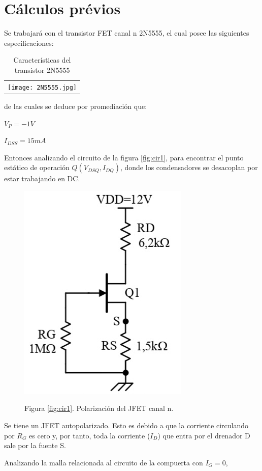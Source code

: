 \documentclass[12pt, a4paper]{article}
\begin{document}
    \newpage

    \section{Cálculos prévios}

    Se trabajará con el transistor FET canal n 2N5555, el cual posee las siguientes especificaciones:
    
    \begin{table}[h!]
        \centering
        \caption{Características del transistor 2N5555} %
        \label{tab:5555} %
        \begin{tabular}{c}
            \texttt{[image: 2N5555.jpg]} \\
        \end{tabular}
    \end{table}
    
    de las cuales se deduce por promediación que:

    $V_P = -1V$

    $I_{DSS} = 15mA$

    Entonces analizando el circuito de la figura \ref{fig:cir1}, para encontrar el punto estático de operación $Q(V_{DSQ},I_{DQ})$, donde los condensadores se desacoplan por estar trabajando en DC.

    \begin{figure}[h!]
        \centering
        \includegraphics[height=5cm\textwidth]{circuito1.jpg} \par
        Figura \ref{fig:cir1}. Polarización del JFET canal n.
    \end{figure}

    Se tiene un JFET autopolarizado. Esto es debido a que la corriente circulando por $R_G$ es cero y, por tanto, toda la corriente ($I_D$) que entra por el drenador D sale por la fuente S.

    Analizando la malla relacionada al circuito de la compuerta con $I_G = 0$,
\end{document}
